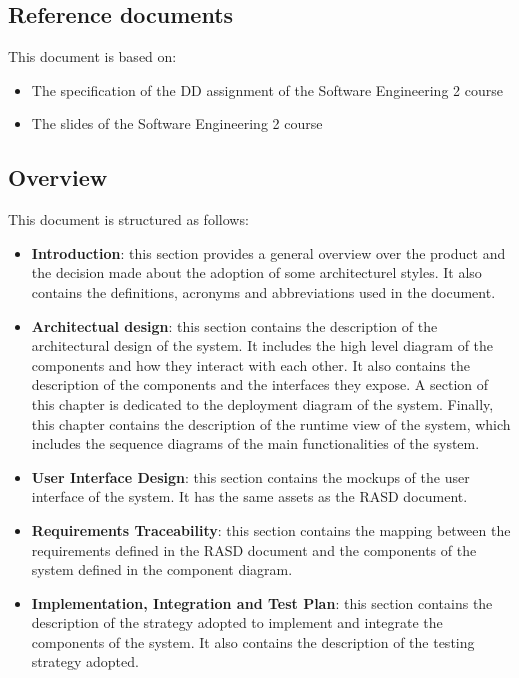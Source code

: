 \subsection{Reference documents}
This document is based on:
\begin{itemize}
    \item The specification of the DD assignment of the Software Engineering 2 course
    \item The slides of the Software Engineering 2 course
\end{itemize}


\subsection{Overview}
This document is structured as follows:
\begin{itemize}
    \item \textbf{Introduction}: this section provides a general overview over the product and the decision made about the adoption of some architecturel styles. It also contains the definitions, acronyms and abbreviations used in the document.
    \item \textbf{Architectual design}: this section contains the description of the architectural design of the system. It includes the high level diagram of the components and how they interact with each other. It also contains the description of the components and the interfaces they expose. A section of this chapter is dedicated to the deployment diagram of the system. Finally, this chapter contains the description of the runtime view of the system, which includes the sequence diagrams of the main functionalities of the system.
    \item \textbf{User Interface Design}: this section contains the mockups of the user interface of the system. It has the same assets as the RASD document.
    \item \textbf{Requirements Traceability}: this section contains the mapping between the requirements defined in the RASD document and the components of the system defined in the component diagram.
    \item \textbf{Implementation, Integration and Test Plan}: this section contains the description of the strategy adopted to implement and integrate the components of the system. It also contains the description of the testing strategy adopted.
\end{itemize}
